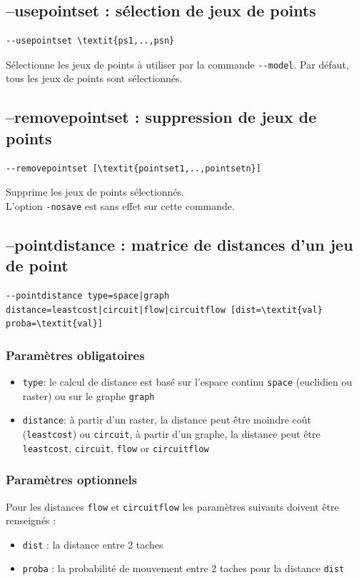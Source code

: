 \documentclass[a4paper,10pt]{report}
\begin{document}
\subsection{--usepointset : sélection de jeux de points}
\begin{Verbatim}[commandchars=\\\{\}]
--usepointset \textit{ps1,..,psn}
\end{Verbatim}
Sélectionne les jeux de points à utiliser par la commande \verb|--model|.
Par défaut, tous les jeux de points sont sélectionnés.

\subsection{--removepointset : suppression de jeux de points}
\begin{Verbatim}[commandchars=\\\{\}]
--removepointset [\textit{pointset1,..,pointsetn}]
\end{Verbatim}
Supprime les jeux de points sélectionnés.\\
L'option \verb|-nosave| est sans effet sur cette commande.

\subsection{--pointdistance : matrice de distances d'un jeu de point}
\begin{Verbatim}[commandchars=\\\{\}]
--pointdistance type=space|graph distance=leastcost|circuit|flow|circuitflow [dist=\textit{val} proba=\textit{val}]
\end{Verbatim}

\subsubsection{Paramètres obligatoires}
\begin{itemize}
	\item \verb|type|: le calcul de distance est basé sur l'espace continu \verb|space| (euclidien ou raster) ou sur le graphe \verb|graph|
	\item \verb|distance|: à partir d'un raster, la distance peut être moindre coût (\verb|leastcost|) ou \verb|circuit|, à partir d'un graphe, la distance peut être \verb|leastcost|, \verb|circuit|, \verb|flow| or \verb|circuitflow|
\end{itemize}

\subsubsection{Paramètres optionnels}
Pour les distances \verb|flow| et \verb|circuitflow| les paramètres suivants doivent être renseignés :
\begin{itemize}
	\item \verb|dist| : la distance entre 2 taches
	\item \verb|proba| : la probabilité de mouvement entre 2 taches pour la distance \verb|dist|
\end{itemize}
\end{document}
